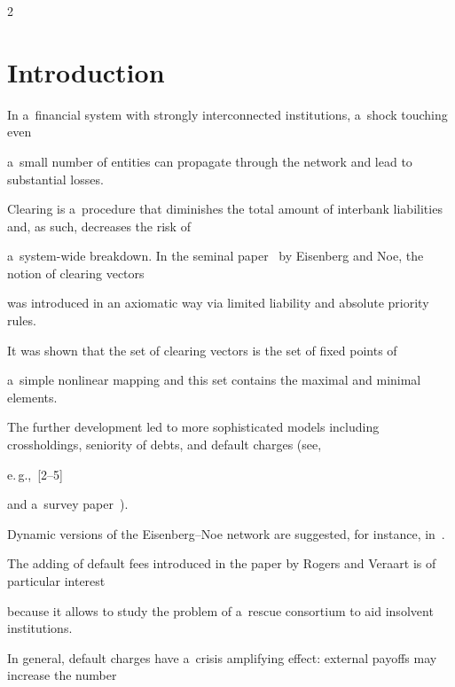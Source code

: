       \begin{multicols}{2}



                  \label{st\stat}

                

    

\section{Introduction}



\noindent

In a~financial system with strongly interconnected institutions, a~shock touching even 

a~small number of entities can propagate through the network and lead to substantial losses. 

Clearing is a~procedure that diminishes the total amount of interbank liabilities and, as such, decreases the risk of 

a~system-wide breakdown. In the seminal paper~\cite{eisenberg2001systemic} by Eisenberg and Noe, the  notion of clearing vectors

 was introduced in an axiomatic way   via  limited liability and absolute priority rules.  

 It was shown that the set of clearing vectors is the set of fixed points of 

 a~simple nonlinear mapping and this set contains the maximal and minimal  elements. 

 The further development led to more sophisticated models including crossholdings, seniority of debts, and default charges (see, 

 e.\,g.,~[2--5] %

 and a~survey paper~\cite{kabanov2018clearing}). 

 Dynamic versions of the Eisenberg--Noe network are suggested, for instance, in~\cite{feinstein2019dynamic, djete2021mean}. 



The adding of default fees introduced in the paper by Rogers and Veraart \cite{RV2013} is of particular interest 

because it allows to study the problem of a~rescue consortium to aid  insolvent institutions. 

In general, default charges have a~crisis amplifying effect: external payoffs may increase the number 


\end{multicols}

